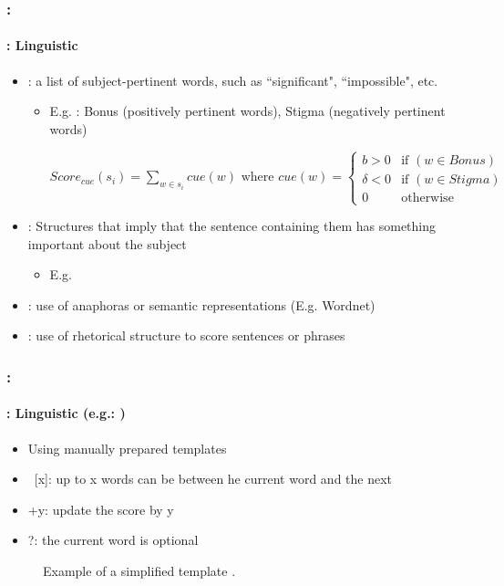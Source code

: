 \documentclass[xcolor=table]{beamer}
\begin{document}
\begin{frame}
	\frametitle{\insertshortsubtitle: \insertsection}
	\framesubtitle{\insertsubsection: Linguistic}
	
	\begin{itemize}
		\item {}: a list of subject-pertinent words, such as ``significant", ``impossible", etc.
		\begin{itemize}
			\item E.g. \cite{69-edmundson}: Bonus (positively pertinent words), Stigma (negatively pertinent words)
			
			$Score_{cue}(s_i) = \sum_{w \in s_i}{cue(w)}
			\text{ where }
			cue(w) = \left\lbrace 
			\begin{array}{ll}
			b > 0 & \text{if } (w \in Bonus) \\
			\delta < 0 & \text{if } (w \in Stigma) \\
			0 & \text{otherwise} 
			\end{array} 
			\right. $
		\end{itemize}
		\item {}: Structures that imply that the sentence containing them has something important about the subject
		\begin{itemize}
			\item E.g. 
		\end{itemize}
		\item {}: use of anaphoras or semantic representations (E.g. Wordnet)
		\item {}: use of rhetorical structure to score sentences or phrases
	\end{itemize}
	
\end{frame}

\begin{frame}
	\frametitle{\insertshortsubtitle: \insertsection}
	\framesubtitle{\insertsubsection: Linguistic (e.g.: \cite{81-paice})}
	
	\begin{itemize}
		\item Using manually prepared templates
		\item\ [x]: up to x words can be between he current word and the next
		\item +y: update the score by y
		\item ?: the current word is optional
	\end{itemize}

	\begin{figure}[!ht]
		\begin{center}
			\caption{Example of a simplified template \cite{81-paice}.}
			\label{fig:paice-template}
		\end{center}
	\end{figure}
	
\end{frame}
\end{document}
